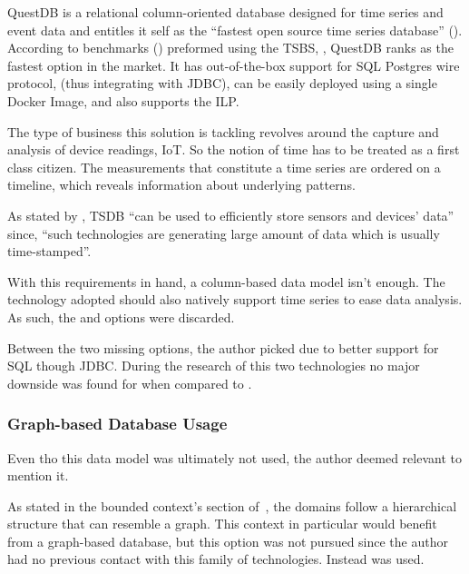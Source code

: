 QuestDB is a relational column-oriented database designed for time series and event data and entitles it self as the ``fastest open source time series database'' (\cite{questdb}).
According to benchmarks (\cite{quest-bench}) preformed using the \gls{TSBS}, \cite{TSBS}, QuestDB ranks as the fastest option in the market.
It has out-of-the-box support for SQL Postgres wire protocol, (thus integrating with \gls{JDBC}), can be easily deployed using a single Docker Image, and also supports the \gls{ILP}.

The type of business this solution is tackling revolves around the capture and analysis of device readings, \gls{IoT}. So the notion of time has to be treated as a first class citizen. The measurements that constitute a time series are ordered on a timeline, which reveals information about underlying patterns.

As stated by \cite{naqvi2017time}, \gls{TSDB} ``can be used to efficiently store sensors and devices' data'' since, ``such technologies are generating large amount of data which is usually time-stamped''.

With this requirements in hand, a column-based data model isn't enough. The technology adopted should also natively support time series to ease data analysis. As such, the  and  options were discarded.

Between the two missing options, the author picked  due to better support for \gls{SQL} though \gls{JDBC}. During the research of this two technologies no major downside was found for  when compared to .

\subsubsection{Graph-based Database Usage}
\label{subsubsec:implementation:decisions:database:identity}

Even tho this data model was ultimately not used, the author deemed relevant to mention it.

As stated in the bounded context's section of~, the domains follow a hierarchical structure that can resemble a graph. This context in particular would benefit from a  graph-based database, but this option was not pursued since the author had no previous contact with this family of technologies. Instead  was used.

